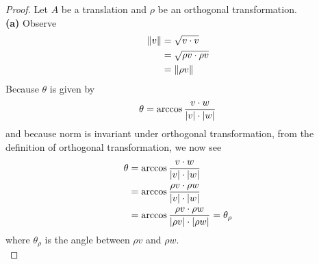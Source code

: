 \documentclass{report}
\begin{document}
\begin{proof}
Let $A$ be a translation and $\rho$ be an orthogonal transformation.\\

\textbf{(a)}
Observe
\begin{align*}
\| v \|&= \sqrt{ v \cdot  v} \\
&=\sqrt{\rho v \cdot \rho v}\\
&=\| \rho v \|
\end{align*}
Because $\theta$ is given by 
\begin{align*}
\theta= \arccos \frac{v \cdot w}{ \left|v\right|\cdot \left|w\right|}
\end{align*}
and because norm is invariant under orthogonal transformation, from the definition of orthogonal transformation, we now see 
 \begin{align*}
\theta &= \arccos \frac{v \cdot w}{\left|v\right|\cdot \left|w\right|}\\
&=\arccos \frac{\rho v \cdot \rho w}{\left|v\right|\cdot \left|w\right|}\\
&=\arccos \frac{\rho v \cdot \rho w}{\left|\rho v\right|\cdot \left|\rho w\right|}=\theta_\rho\\
\end{align*}
where $\theta_\rho$ is the angle between $\rho v$ and $\rho w$. \\


\end{proof}
\end{document}
